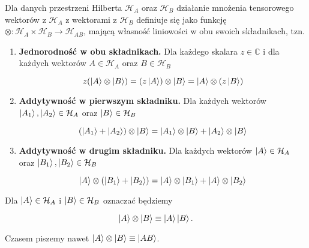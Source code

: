 \begin{definition}
    Dla danych przestrzeni Hilberta $\mathcal{H}_A$ oraz $\mathcal{H}_B$ działanie mnożenia tensorowego wektorów z $\mathcal{H}_A$ z wektorami z $\mathcal{H}_B$ definiuje się jako funkcję $\otimes: \mathcal{H}_A \times \mathcal{H}_B \rightarrow \mathcal{H}_{AB}$, mającą własność liniowości w obu swoich składnikach, tzn.

    \begin{enumerate}
        \item \textbf{Jednorodność w obu składnikach.}
            Dla każdego skalara $z \in \mathbb{C}$ i dla każdych wektorów $A \in \mathcal{H}_A$ oraz $B \in \mathcal{H}_B$

            $$
                z (\ket{A} \otimes \ket{B}) = (z \ket{A}) \otimes \ket{B} = \ket{A} \otimes (z \ket{B})
            $$
        \item \textbf{Addytywność w pierwszym składniku.}
            Dla każdych wektorów $\ket{A_1}, \ket{A_2} \in \mathcal {H}_A$ oraz $\ket{B} \in \mathcal{H}_B$

            $$
                (\ket{A_1} + \ket{A_2}) \otimes \ket{B} = \ket{A_1} \otimes \ket{B} + \ket{A_2} \otimes \ket{B}
            $$
        \item \textbf{Addytywność w drugim składniku.}
            Dla każdych wektorów $\ket{A} \in \mathcal{H}_A$ oraz $\ket{B_1}, \ket{B_2} \in \mathcal{H}_B$

            $$
                \ket{A} \otimes (\ket{B_1} + \ket{B_2}) = \ket{A} \otimes \ket{B_1} + \ket{A} \otimes \ket{B_2}
            $$
    \end{enumerate}
\end{definition}

\begin{remark}[Oznaczenia]
    Dla $\ket{A} \in \mathcal{H}_{A}$ i $\ket{B} \in \mathcal{H}_{B}$ oznaczać będziemy 

    $$
        \ket{A} \otimes \ket{B} \equiv \ket{A} \ket{B}.
    $$

    Czasem piszemy nawet $\ket{A} \otimes \ket{B} \equiv \ket{A B}$.
\end{remark}

